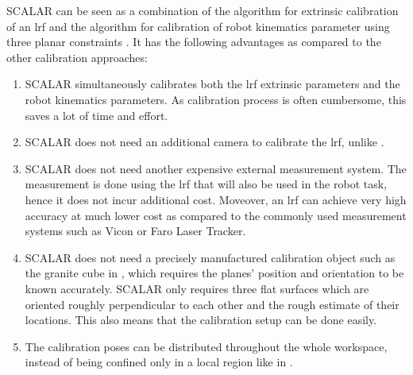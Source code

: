 SCALAR can be seen as a combination of the algorithm for extrinsic calibration of an \ac{lrf} \cite{Zhang2004} and the algorithm for calibration of robot kinematics parameter using three planar constraints \cite{Joubair2015}. It has the following advantages as compared to the other calibration approaches:
\begin{enumerate}
\item SCALAR simultaneously calibrates both the \ac{lrf} extrinsic parameters and the robot kinematics parameters. As calibration process is often cumbersome, this saves a lot of time and effort.
\item SCALAR does not need an additional camera to calibrate the \ac{lrf}, unlike \cite{Zhang2004}.
\item SCALAR does not need another expensive external measurement system. The measurement is done using the \ac{lrf} that will also be used in the robot task, hence it does not incur additional cost. Moveover, an \ac{lrf} can achieve very high accuracy at much lower cost as compared to the commonly used measurement systems such as Vicon or Faro Laser Tracker. 
\item SCALAR does not need a precisely manufactured calibration object such as the granite cube in \cite{Joubair2015}, which requires the planes' position and orientation to be known accurately. SCALAR only requires
three flat surfaces which are oriented roughly perpendicular to each other and the rough estimate of their locations. This also means that the calibration setup can be done easily.
\item The calibration poses can be distributed throughout the whole workspace, instead of being confined only in a local region like in \cite{Joubair2015}. 
\end{enumerate}



